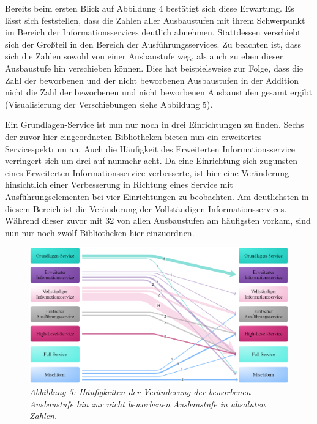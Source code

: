 \documentclass[a4paper,
fontsize=11pt,
oneside,
numbers=noperiodatend,
parskip=half-,
bibliography=totoc,
final
]{scrartcl}
\begin{document}
Bereits beim ersten Blick auf Abbildung 4 bestätigt sich diese
Erwartung. Es lässt sich feststellen, dass die Zahlen aller Ausbaustufen
mit ihrem Schwerpunkt im Bereich der Informationsservices deutlich
abnehmen. Stattdessen verschiebt sich der Großteil in den Bereich der
Ausführungsservices. Zu beachten ist, dass sich die Zahlen sowohl von
einer Ausbaustufe weg, als auch zu eben dieser Ausbaustufe hin
verschieben können. Dies hat beispielsweise zur Folge, dass die Zahl der
beworbenen und der nicht beworbenen Ausbaustufen in der Addition nicht
die Zahl der beworbenen und nicht beworbenen Ausbaustufen gesamt ergibt
(Visualisierung der Verschiebungen siehe Abbildung 5).

Ein Grundlagen-Service ist nun nur noch in drei Einrichtungen zu finden.
Sechs der zuvor hier eingeordneten Bibliotheken bieten nun ein
erweitertes Servicespektrum an. Auch die Häufigkeit des Erweiterten
Informationsservice verringert sich um drei auf nunmehr acht. Da eine
Einrichtung sich zugunsten eines Erweiterten Informationsservice
verbesserte, ist hier eine Veränderung hinsichtlich einer Verbesserung
in Richtung eines Service mit Ausführungselementen bei vier
Einrichtungen zu beobachten. Am deutlichsten in diesem Bereich ist die
Veränderung der Vollständigen Informationsservices. Während dieser zuvor
mit 32 von allen Ausbaustufen am häufigsten vorkam, sind nun nur noch zwölf
Bibliotheken hier einzuordnen.

\begin{figure}[h!]
\centering
\includegraphics[width=.9\textwidth]{img/abb5.png}
\caption[Abbildung 5: Häufigkeiten der Veränderung der beworbenen
Ausbaustufe hin zur nicht beworbenen Ausbaustufe in absoluten
Zahlen.]{\textit{Abbildung 5: Häufigkeiten der Veränderung der beworbenen
Ausbaustufe hin zur nicht beworbenen Ausbaustufe in absoluten
Zahlen.}\footnotemark{}}
\end{figure}
\end{document}
